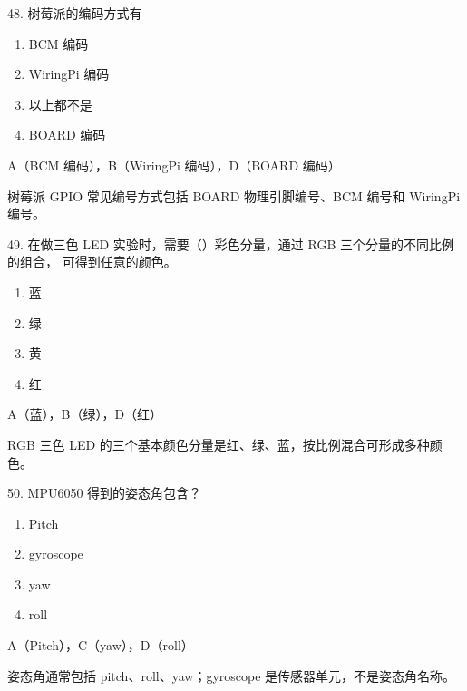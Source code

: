 \begin{question}{48. 树莓派的编码方式有}
\begin{enumerate}[label=\Alph*., leftmargin=2.4em, itemsep=0.2em]
\item BCM 编码
\item WiringPi 编码
\item 以上都不是
\item BOARD 编码
\end{enumerate}
\end{question}
\begin{answer}
A（BCM 编码），B（WiringPi 编码），D（BOARD 编码）
\end{answer}
\begin{explanation}
树莓派 GPIO 常见编号方式包括 BOARD 物理引脚编号、BCM 编号和 WiringPi 编号。
\end{explanation}

\begin{question}{49. 在做三色 LED 实验时，需要（）彩色分量，通过 RGB 三个分量的不同比例的组合， 可得到任意的颜色。}
\begin{enumerate}[label=\Alph*., leftmargin=2.4em, itemsep=0.2em]
\item 蓝
\item 绿
\item 黄
\item 红
\end{enumerate}
\end{question}
\begin{answer}
A（蓝），B（绿），D（红）
\end{answer}
\begin{explanation}
RGB 三色 LED 的三个基本颜色分量是红、绿、蓝，按比例混合可形成多种颜色。
\end{explanation}

\begin{question}{50. MPU6050 得到的姿态角包含？}
\begin{enumerate}[label=\Alph*., leftmargin=2.4em, itemsep=0.2em]
\item Pitch
\item gyroscope
\item yaw
\item roll
\end{enumerate}
\end{question}
\begin{answer}
A（Pitch），C（yaw），D（roll）
\end{answer}
\begin{explanation}
姿态角通常包括 pitch、roll、yaw；gyroscope 是传感器单元，不是姿态角名称。
\end{explanation}

